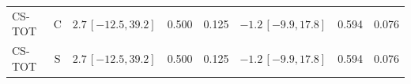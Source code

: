 \begin{longtable}{lcp{37mm}rrp{37mm}rr}
CS-TOT & C & \(2.7\,[-12.5,39.2]\) & 0.500 & 0.125 & \(-1.2\,[-9.9,17.8]\) & 0.594 & 0.076\\
CS-TOT & S & \(2.7\,[-12.5,39.2]\) & 0.500 & 0.125 & \(-1.2\,[-9.9,17.8]\) & 0.594 & 0.076\\

\end{longtable}
